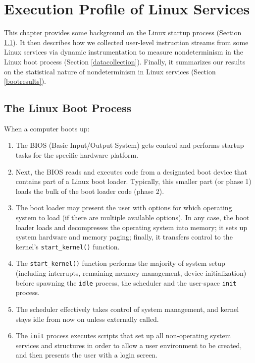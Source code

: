 \chapter{Execution Profile of Linux Services} \label{ch:boot}
This chapter provides some background on the
Linux startup process (Section \ref{linuxboot}).  
It then describes how we collected user-level instruction
streams from some Linux services via dynamic instrumentation to 
measure nondeterminism in the Linux boot process (Section \ref{datacollection}).
Finally, it summarizes our results on the statistical nature
of nondeterminism in Linux services (Section \ref{bootresults}).

\section{The Linux Boot Process}\label{linuxboot}
When a computer boots up:
\begin{enumerate}
\item The BIOS (Basic Input/Output System) 
gets control and performs startup tasks for the specific hardware platform.
\item Next, the BIOS reads and executes code from a designated boot device 
that contains part of a Linux boot loader. Typically,
this smaller part (or phase 1) 
loads the bulk of the boot loader code (phase 2).
\item The boot loader may present the user with options for 
which operating system to load (if there are multiple available options).
In any case, the boot loader loads and decompresses the operating system
into memory; it sets up system hardware and
memory paging; finally, it transfers control to the kernel's
\texttt{start\_kernel()} function.
\item The \texttt{start\_kernel()} function performs the 
majority of system setup (including interrupts, remaining memory
 management, device initialization)
before spawning the \texttt{idle} process, the scheduler
and the user-space \texttt{init} process.
\item The scheduler effectively takes control of system management,
and kernel stays idle from now on unless externally called.
\item The \texttt{init} process executes scripts that set up all
non-operating system services and structures in order to allow 
a user environment to be created, and then presents the user with a login screen.
\end{enumerate}

